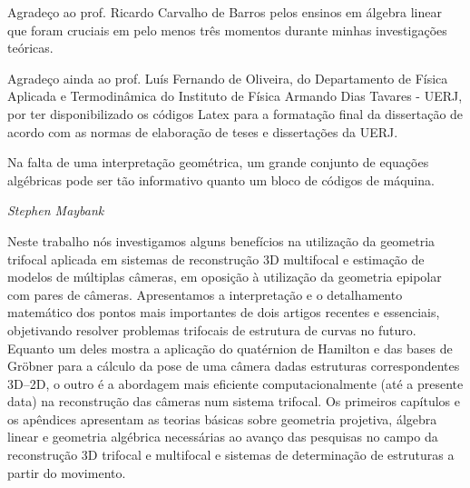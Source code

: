 \documentclass[a4paper,12pt,oneside,onecolumn,final,fleqn]{repUERJ}
\begin{document}
Agradeço ao prof. Ricardo Carvalho de Barros pelos ensinos em álgebra linear que foram cruciais em pelo menos três momentos durante minhas investigações teóricas.

Agradeço ainda ao prof. Luís Fernando de Oliveira, do Departamento de Física Aplicada e Termodinâmica do Instituto de Física Armando Dias Tavares - UERJ, por ter disponibilizado os c\'odigos Latex para a formataç\~ao final da dissertaç\~ao de acordo com as normas de elaboração de teses e dissertações da UERJ.
\pretextualchapter{}
  \vfill
  \begin{flushright}
    Na falta de uma interpretação geométrica, um grande conjunto de equações algébricas pode ser tão informativo quanto um bloco de códigos de máquina.
  \end{flushright}
  \begin{flushright}
{\it Stephen Maybank}
\end{flushright}

Neste trabalho nós investigamos alguns benefícios na utilização da geometria trifocal aplicada em sistemas de reconstrução 3D multifocal e estimação de modelos de múltiplas câmeras, em oposição à utilização da geometria epipolar com pares de câmeras. Apresentamos a interpretação e o detalhamento matemático dos pontos mais importantes de dois artigos recentes e essenciais, objetivando resolver problemas trifocais de estrutura de curvas no futuro. Equanto um deles mostra a aplicação do quatérnion de Hamilton e das bases de Gr\"obner para a cálculo da pose de uma câmera dadas estruturas correspondentes 3D--2D, o outro é a abordagem mais eficiente computacionalmente (até a presente data) na reconstrução das câmeras num sistema trifocal. Os primeiros capítulos e os apêndices apresentam as teorias básicas sobre geometria projetiva, álgebra linear e geometria algébrica necessárias ao avanço das pesquisas no campo da reconstrução 3D trifocal e multifocal e sistemas de determinação de estruturas a partir do movimento.\\

\imprimirchaves %
\end{document}
